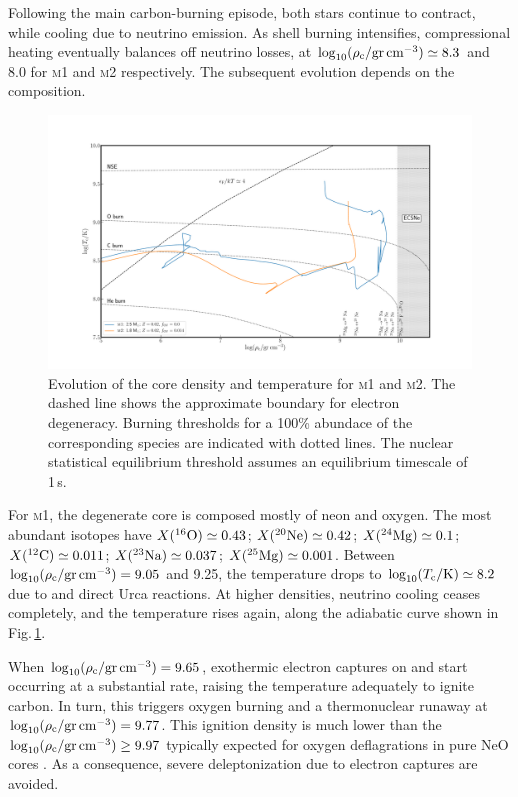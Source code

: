 \documentclass[../../main/thesis_msc.tex]{subfiles}
\begin{document}
Following the main carbon-burning episode, both stars continue to contract, while cooling  due to neutrino  emission. As shell 
burning intensifies, compressional heating eventually balances 
off neutrino losses, at $\logrhoc \simeq 8.3$ and 8.0 for \textsc{m1} and \textsc{m2} respectively. The subsequent evolution depends on the composition. 
\begin{figure}[htb!]
\begin{center}
\includegraphics[width=1.0\textwidth]{../figures/chapter3/Rhoc_vs_Tc.pdf}
\caption{Evolution of the core density and temperature for \textsc{m1} and \textsc{m2}. The dashed line shows the approximate boundary for electron degeneracy. Burning thresholds for a 100\% abundace of the corresponding species are indicated with dotted lines. The nuclear statistical equilibrium threshold assumes an equilibrium timescale of 1\,s.}
\label{fig:2}
\end{center}
\end{figure}
For \textsc{m1}, the degenerate core is composed 
mostly of neon and oxygen. The most abundant isotopes have  $\abun{O}{16}\simeq 0.43$;  $\abun{Ne}{20}\simeq 0.42$; $\abun{Mg}{24}\simeq0.1$;  $\abun{C}{12}\simeq 0.011$; $\abun{Na}{23}\simeq 0.037$; $\abun{Mg}{25}\simeq 0.001$. Between $\logrhoc=9.05$ and 9.25, the temperature drops to $\logtc\simeq 8.2$ due to  and  direct Urca reactions. At higher densities, neutrino cooling ceases completely, and the temperature rises again, along the adiabatic curve shown in Fig.\,\ref{fig:2}.  

When $\logrhoc=9.65$, exothermic electron captures on  and 
 start occurring at a substantial rate, raising the temperature 
adequately to ignite carbon. In turn, this triggers oxygen burning and a thermonuclear runaway at  $\logrhoc= 9.77$. This ignition density is much lower than the   $\logrhoc\ge 9.97$ typically expected for oxygen deflagrations  in pure NeO cores \citep{Jones:2018ule}. As a consequence, severe deleptonization due to  electron captures are avoided. 
\end{document}
